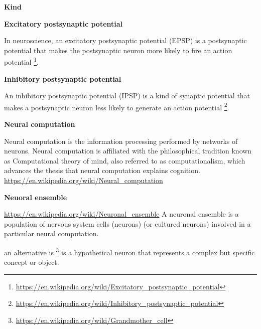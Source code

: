 \documentclass{book}
\providecommand{\ProjectDeepHeading}[2]{%
    \par\medskip\noindent\textbf{#2}\par\smallskip
}
\providecommand{\seeherefooter}[1]{\footnote{\url{#1}}}
\providecommand{\clickurlfooter}[1]{\footnote{\url{#1}}}
\begin{document}
\ProjectDeepHeading{9}{Kind}

\ProjectDeepHeading{10}{Excitatory postsynaptic potential}


In neuroscience, an excitatory postsynaptic potential (EPSP) is a postsynaptic potential that makes the postsynaptic neuron more likely to fire an action potential \seeherefooter{https://en.wikipedia.org/wiki/Excitatory_postsynaptic_potential}.

\ProjectDeepHeading{10}{Inhibitory postsynaptic potential}


An inhibitory postsynaptic potential (IPSP) is a kind of synaptic potential that makes a postsynaptic neuron less likely to generate an action potential \seeherefooter{https://en.wikipedia.org/wiki/Inhibitory_postsynaptic_potential}.

\ProjectDeepHeading{5}{Neural computation}


Neural computation is the information processing performed by networks of neurons. Neural computation is affiliated with the philosophical tradition known as Computational theory of mind, also referred to as computationalism, which advances the thesis that neural computation explains cognition.
    \url{https://en.wikipedia.org/wiki/Neural_computation}

\ProjectDeepHeading{6}{Neuoral ensemble}


\url{https://en.wikipedia.org/wiki/Neuronal_ensemble}
    A neuronal ensemble is a population of nervous system cells (neurons) (or cultured neurons) involved in a particular neural computation.
    
    an alternative is \clickurlfooter{https://en.wikipedia.org/wiki/Grandmother_cell}  is a hypothetical neuron that represents a complex but specific concept or object.
\end{document}
